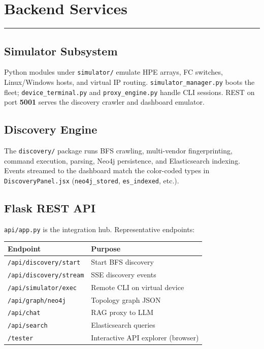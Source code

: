 \documentclass[11pt,a4paper]{article}
\begin{document}
\section{Backend Services}

\vspace{0.3cm}\hrule\vspace{0.6cm}

\subsection{Simulator Subsystem}

Python modules under \texttt{simulator/} emulate HPE arrays, FC switches, Linux/Windows hosts, and virtual IP routing. \texttt{simulator\_manager.py} boots the fleet; \texttt{device\_terminal.py} and \texttt{proxy\_engine.py} handle CLI sessions. REST on port \textbf{5001} serves the discovery crawler and dashboard emulator.

\subsection{Discovery Engine}

The \texttt{discovery/} package runs BFS crawling, multi-vendor fingerprinting, command execution, parsing, Neo4j persistence, and Elasticsearch indexing. Events streamed to the dashboard match the color-coded types in \texttt{DiscoveryPanel.jsx} (\texttt{neo4j\_stored}, \texttt{es\_indexed}, etc.).

\subsection{Flask REST API}

\texttt{api/app.py} is the integration hub. Representative endpoints:

\begin{longtable}{p{5.2cm} p{8.8cm}}
\toprule
\rowcolor{headerbg}
\textbf{Endpoint} & \textbf{Purpose} \\
\midrule
\texttt{/api/discovery/start} & Start BFS discovery \\
\texttt{/api/discovery/stream} & SSE discovery events \\
\texttt{/api/simulator/exec} & Remote CLI on virtual device \\
\texttt{/api/graph/neo4j} & Topology graph JSON \\
\texttt{/api/chat} & RAG proxy to LLM \\
\texttt{/api/search} & Elasticsearch queries \\
\texttt{/tester} & Interactive API explorer (browser) \\
\bottomrule
\end{longtable}
\end{document}
